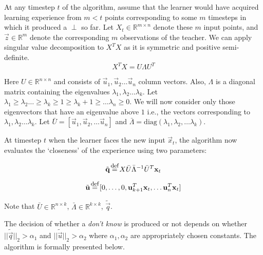 At any timestep $t$ of the algorithm, assume that the learner would have acquired learning experience from $m < t$ points  corresponding to some $m$ timesteps in which it produced a $\perp$ so far.  Let $X_t \in \mathbb{R}^{m \times n}$ denote these $m$ input points, and $\vec{z} \in \mathbb{R}^m$ denote the corresponding $m$ observations of the teacher.  We can apply singular value decomposition to $X^{T}X$ as it is symmetric and positive semi-definite.  
\begin{equation}
X^TX = U \Lambda U^T
\end{equation}


Here $U \in \mathbb{R}^{n \times n}$ and consists of $\vec{u}_1, \vec{u}_2 \hdots \vec{u}_n$ column vectors. Also, $\Lambda$ is a diagonal matrix containing the eigenvalues $\lambda_1, \lambda_2 \hdots \lambda_k$. Let $\lambda_1 \geq \lambda_2 \hdots \geq \lambda_k \geq 1 \geq \lambda_k+1 \geq \hdots \lambda_n \geq 0 $. We will now consider only those eigenvectors that have an eigenvalue above $1$ i.e., the vectors corresponding to $\lambda_1, \lambda_2 \hdots \lambda_k$. Let $\bar{U} = [\vec{u}_1 ,\vec{u}_2, \hdots \vec{u}_n]$ and $\bar{\Lambda} = \text{diag}(\lambda_1, \lambda_2, \hdots \lambda_k)$. 

At timestep $t$ when the learner faces the new input $\vec{x}_t$, the algorithm now evaluates the `closeness' of the experience using two parameters:

\begin{equation}
\label{eq:q}
\tilde{\vec{q}} \defeq X \bar{U}\bar{\Lambda}^{-1} \bar{U}^T \vec{x}_t 
\end{equation}


\begin{equation}
\label{eq:u}
\tilde{\vec{u}} \defeq [0, \hdots, 0, \vec{u}_{k+1}^T \vec{x}_t, \hdots \vec{u}_{n}^T \vec{x}_t]
\end{equation}

Note that $\bar{U} \in \mathbb{R}^{n \times k}$, $\bar{\Lambda} \in \mathbb{R}^{k \times k}$, $\tilde{\vec{q}}$. 

The decision of whether a \textit{don't know} is produced or not depends on whether $||\tilde{\vec{q}}||_2  > \alpha_1$ and $||\tilde{\vec{u}} ||_2 > \alpha_2$ where $\alpha_1, \alpha_2$ are appropriately chosen constants. The algorithm is formally presented below.

